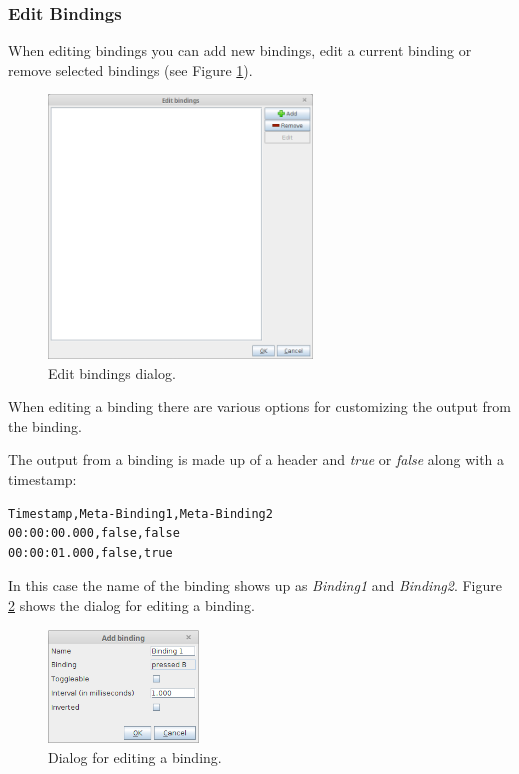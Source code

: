 \documentclass[a4paper]{book}
\begin{document}
\subsubsection{Edit Bindings}
When editing bindings you can add new bindings, edit a current binding or
remove selected bindings (see Figure \ref{AnnotationEditBindingsDialog}).

\begin{figure}[htb]
  \centering
  \includegraphics[width=7.0cm]{images/AnnotationEditBindingsDialog.png}
  \caption{Edit bindings dialog.}
  \label{AnnotationEditBindingsDialog}
\end{figure}

When editing a binding there are various options for customizing the output
from the binding.

The output from a binding is made up of a header and \textit{true} or
\textit{false} along with a timestamp:

\begin{verbatim}
Timestamp,Meta-Binding1,Meta-Binding2
00:00:00.000,false,false
00:00:01.000,false,true
\end{verbatim}

In this case the name of the binding shows up as \textit{Binding1} and
\textit{Binding2}. Figure \ref{add_binding} shows the dialog for editing a
binding.

\begin{figure}[htb]
  \centering
  \includegraphics[width=4.0cm]{images/add_binding.png}
  \caption{Dialog for editing a binding.}
  \label{add_binding}
\end{figure}
\end{document}
